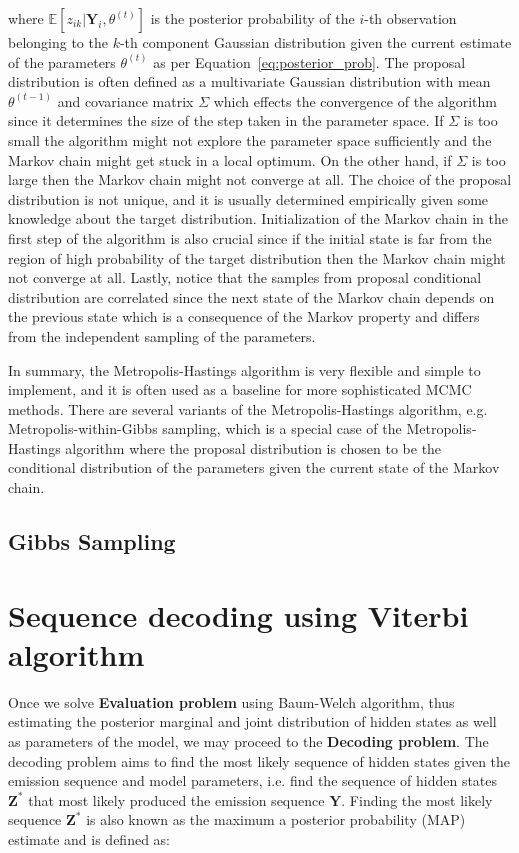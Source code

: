 where $\mathbb{E}[z_{ik}|\textbf{Y}_i,\theta^{(t)}]$ is the posterior probability of the $i$-th observation belonging to the $k$-th component Gaussian distribution given the current estimate of the parameters $\theta^{(t)}$ as per Equation~\ref{eq:posterior_prob}.
The proposal distribution is often defined as a multivariate Gaussian distribution with mean $\theta^{(t-1)}$ and covariance matrix $\Sigma$ which effects the convergence of the algorithm since it determines the size of the step taken in the parameter space. 
If $\Sigma$ is too small the algorithm might not explore the parameter space sufficiently and the Markov chain might get stuck in a local optimum. On the other hand, if $\Sigma$ is too large then the Markov chain might not converge at all. 
The choice of the proposal distribution is not unique, and it is usually determined empirically given some knowledge about the target distribution. 
Initialization of the Markov chain in the first step of the algorithm is also crucial since if the initial state is far from the region of high probability of the target distribution then the Markov chain might not converge at all.
Lastly, notice that the samples from proposal conditional distribution are correlated since the next state of the Markov chain depends on the previous state which is a consequence of the Markov property and differs from the independent sampling of the parameters.

In summary, the Metropolis-Hastings algorithm is very flexible and simple to implement, and it is often used as a baseline for more sophisticated MCMC methods. 
There are several variants of the Metropolis-Hastings algorithm, e.g. Metropolis-within-Gibbs sampling, which is a special case of the Metropolis-Hastings algorithm where the proposal distribution is chosen to be the conditional distribution of the parameters given the current state of the Markov chain.

\subsection{Gibbs Sampling}

\section{Sequence decoding using Viterbi algorithm}

Once we solve \textbf{Evaluation problem} using Baum-Welch algorithm, thus estimating the posterior marginal and joint distribution of hidden states as well as parameters of the model,
we may proceed to the \textbf{Decoding problem}. The decoding problem aims to find the most likely sequence of hidden states given the emission sequence and model parameters, i.e. 
find the sequence of hidden states $\textbf{Z}^*$ that most likely produced the emission sequence $\textbf{Y}$. Finding the most likely sequence $\textbf{Z}^*$ is also known as 
the maximum a posterior probability (MAP) estimate and is defined as:

